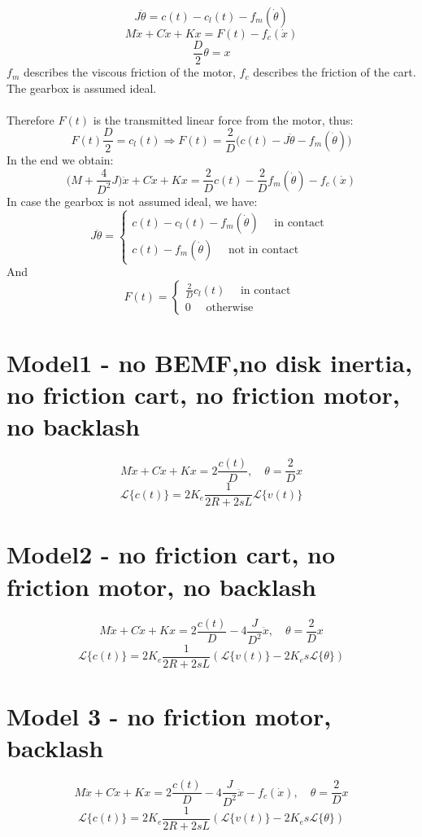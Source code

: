 $$J\ddot{\theta}=c(t)-c_l(t) - f_m(\dot{\theta})$$
$$M\ddot{x}+C\dot{x}+Kx = F(t) - f_c(\dot{x})$$
$$\frac{D}{2}\theta = x$$
$f_m$ describes the viscous friction of the motor, $f_c$ describes the friction of the cart. The gearbox is assumed ideal. \\ \\
Therefore $F(t)$ is the transmitted linear force from the motor, thus:
$$F(t)\frac{D}{2} = c_l(t) \Rightarrow F(t) = \frac{2}{D} \Big(c(t)-J\ddot{\theta}-f_m(\dot{\theta})\Big)$$
In the end we obtain:
$$\Big(M+\frac{4}{D^2} J\Big) \ddot{x}+C\dot{x}+Kx = \frac{2}{D}c(t) -\frac{2}{D}f_m(\dot{\theta}) - f_c(\dot{x})$$
In case the gearbox is not assumed ideal, we have:
$$J\ddot{\theta}= \begin{cases}
c(t)-c_l(t) - f_m(\dot{\theta}) \quad \text{ in contact } \\
c(t)-f_m(\dot{\theta}) \quad \text{ not in contact }
\end{cases}
$$
And
$$F(t) = \begin{cases}
\frac{2}{D}c_l(t)\quad \text{ in contact } \\
0 \quad \text{ otherwise }
\end{cases}
$$

\section{Model1 - no BEMF,no disk inertia, no friction cart, no friction motor, no backlash}
$$M\ddot{x} + C\dot{x}+Kx = 2\frac{c(t)}{D}, \quad \theta = \frac{2}{D}x$$
$$\mathcal{L}\{c(t)\} = 2K_e \frac{1}{2R+2sL} \mathcal{L}\{ v(t)\}$$

\section{Model2 - no friction cart, no friction motor, no backlash}
$$M\ddot{x} + C\dot{x}+Kx = 2\frac{c(t)}{D}  - 4\frac{J}{D^2}\ddot{x}, \quad \theta = \frac{2}{D}x$$
$$\mathcal{L}\{c(t)\} = 2K_e \frac{1}{2R+2sL} (\mathcal{L}\{ v(t)\}-2K_e s \mathcal{L}\{\theta \})$$


\section{Model 3 - no friction motor, backlash}
$$M\ddot{x} + C\dot{x}+Kx = 2\frac{c(t)}{D} - 4\frac{J}{D^2}\ddot{x} - f_c(\dot{x}), \quad \theta = \frac{2}{D}x$$
$$\mathcal{L}\{c(t)\} = 2K_e \frac{1}{2R+2sL} (\mathcal{L}\{ v(t)\}-2K_e s \mathcal{L}\{\theta \})$$



